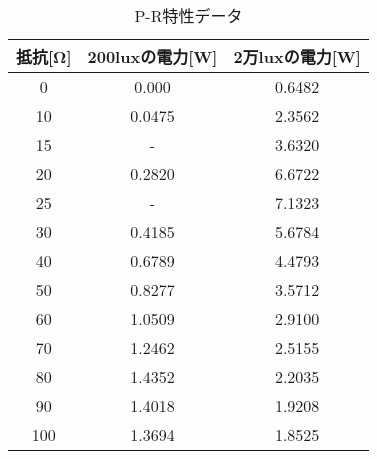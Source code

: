 \documentclass[a4paper,11pt,xelatex,ja=standard]{bxjsarticle}
\begin{document}
            \begin{table}[H]
                \centering
                \caption{P-R特性データ}
                \begin{tabular}{|c|c|c|}
                    \hline
                    抵抗[Ω] & 200luxの電力[W] & 2万luxの電力[W] \\
                    \hline
                    0 & 0.000 & 0.6482 \\
                    10 & 0.0475 & 2.3562 \\
                    15 & - & 3.6320 \\
                    20 & 0.2820 & 6.6722 \\
                    25 & - & 7.1323 \\
                    30 & 0.4185 & 5.6784 \\
                    40 & 0.6789 & 4.4793 \\
                    50 & 0.8277 & 3.5712 \\
                    60 & 1.0509 & 2.9100 \\
                    70 & 1.2462 & 2.5155 \\
                    80 & 1.4352 & 2.2035 \\
                    90 & 1.4018 & 1.9208 \\
                    100 & 1.3694 & 1.8525 \\
                    \hline
                \end{tabular}
            \end{table}
            
\end{document}
